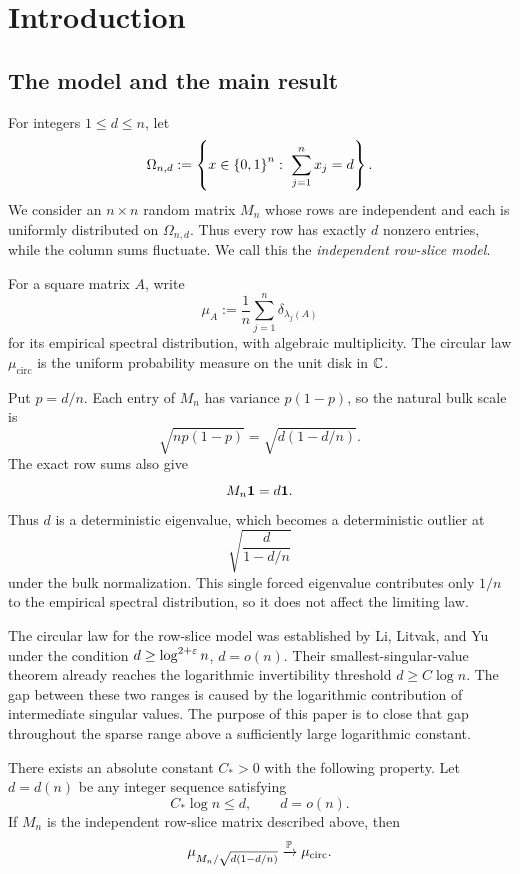 \section{Introduction}

\subsection{The model and the main result}

For integers $1\le d\le n$, let
\[
  \Omega_{n,d}:=\set{x\in\set{0,1}^n:\ \sum_{j=1}^n x_j=d}.
\]
We consider an $n\times n$ random matrix $M_n$ whose rows are independent and each is uniformly distributed on $\Omega_{n,d}$. Thus every row has exactly $d$ nonzero entries, while the column sums fluctuate. We call this the \emph{independent row-slice model}.

For a square matrix $A$, write
\[
  \mu_A:=\frac1n\sum_{j=1}^n\delta_{\lambda_j(A)}
\]
for its empirical spectral distribution, with algebraic multiplicity. The circular law $\mu_{\mathrm{circ}}$ is the uniform probability measure on the unit disk in $\mathbb C$.

Put $p=d/n$. Each entry of $M_n$ has variance $p(1-p)$, so the natural bulk scale is
\[
  \sqrt{np(1-p)}=\sqrt{d(1-d/n)}.
\]
The exact row sums also give
\[
  M_n\mathbf 1=d\mathbf 1.
\]
Thus $d$ is a deterministic eigenvalue, which becomes a deterministic outlier at
\[
  \sqrt{\frac{d}{1-d/n}}
\]
under the bulk normalization. This single forced eigenvalue contributes only $1/n$ to the empirical spectral distribution, so it does not affect the limiting law.

The circular law for the row-slice model was established by Li, Litvak, and Yu~\cite{LLY26a} under the condition $d\ge \log^{2+\varepsilon}n$, $d=o(n)$. Their smallest-singular-value theorem already reaches the logarithmic invertibility threshold $d\ge C\log n$. The gap between these two ranges is caused by the logarithmic contribution of intermediate singular values. The purpose of this paper is to close that gap throughout the sparse range above a sufficiently large logarithmic constant.

\begin{theorem}\label{thm:main}
There exists an absolute constant $C_*>0$ with the following property. Let $d=d(n)$ be any integer sequence satisfying
\[
  C_*\log n\le d,
  \qquad
  d=o(n).
\]
If $M_n$ is the independent row-slice matrix described above, then
\[
  \mu_{M_n/\sqrt{d(1-d/n)}}\xrightarrow{\mathbb P}\mu_{\mathrm{circ}}.
\]
\end{theorem}

